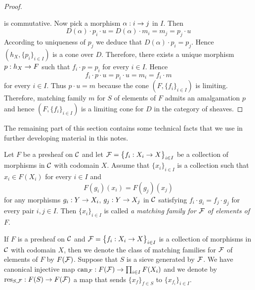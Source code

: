\begin{proof}
\begin{center}
\end{center}
is commutative. Now pick a morphism $\alpha:i\rightarrow j$ in $I$. Then 
$$D(\alpha)\cdot p_i\cdot u = D(\alpha)\cdot m_i = m_j = p_j\cdot u$$
According to uniqueness of $p_j$ we deduce that $D(\alpha)\cdot p_i = p_j$. Hence $\left(h_X,\big\{p_i\big\}_{i\in I}\right)$ is a cone over $D$. Therefore, there exists a unique morphism $p:h_X\rightarrow F$  such that $f_i\cdot p = p_i$ for every $i\in I$. Hence 
$$f_i\cdot p\cdot u=p_i\cdot u= m_i = f_i\cdot m$$
for every $i\in I$. Thus $p\cdot u = m$ because the cone $\left(F,\big\{f_i\big\}_{i\in I}\right)$ is limiting. Therefore, matching family $m$ for $S$ of elements of $F$ admits an amalgamation $p$ and hence $\left(F,\big\{f_i\big\}_{i\in I}\right)$ is a limiting cone for $D$ in the category of sheaves. 
\end{proof}
\noindent
The remaining part of this section contains some technical facts that we use in further developing material in this notes.

\begin{definition}
Let $F$ be a presheaf on ${\mathcal C}$ and let ${\mathcal F} = \big\{f_i:X_i\rightarrow X\big\}_{i\in I}$ be a collection of morphisms in ${\mathcal C}$ with codomain $X$. Assume that $\{x_i\}_{i\in I}$ is a collection such that $x_i\in F(X_i)$ for every $i\in I$ and
$$F(g_i)(x_i) = F(g_j)(x_j)$$
for any morphisms $g_i:Y\rightarrow X_i$, $g_j:Y\rightarrow X_j$ in ${\mathcal C}$ satisfying $f_i\cdot g_i = f_j\cdot g_j$ for every pair $i,j\in I$. Then $\{x_i\}_{i\in I}$ is called \textit{a matching family for ${\mathcal F}$ of elements of $F$}.
\end{definition}
\noindent
If $F$ is a presheaf on ${\mathcal C}$ and ${\mathcal F} = \big\{f_i:X_i\rightarrow X\big\}_{i\in I}$ is a collection of morphisms in ${\mathcal C}$ with codomain $X$, then we denote the class of matching families for ${\mathcal F}$ of elements of $F$ by $F({\mathcal F})$. Suppose that $S$ is a sieve generated by ${\mathcal F}$. We have canonical injective map $\mathrm{can}_{{\mathcal F}}:F({\mathcal F})\rightarrow \prod_{i\in I}F(X_i)$ and we denote by $\mathrm{res}_{S,{\mathcal F}}:F(S)\rightarrow F({\mathcal F})$ a map that sends $\{x_f\}_{f\in S}$ to $\{x_{f_i}\}_{i\in I}$.

